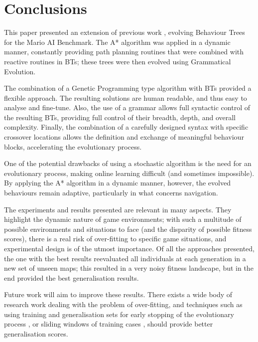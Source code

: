 \documentclass[conference]{IEEEtran}
\begin{document}
\section{Conclusions}

This paper presented an extension of previous work \cite{PNO11}, evolving
Behaviour Trees for the Mario AI Benchmark. The A* algorithm was applied in a
dynamic manner, constantly providing path planning routines that were combined
with reactive routines in BTs; these trees were then evolved using Grammatical
Evolution.

The combination of a Genetic Programming type algorithm with BTs provided a
flexible approach. The resulting solutions are human readable, and
thus easy to analyse and fine-tune. Also, the use of a grammar allows full
syntactic control of the resulting BTs, providing full control of their
breadth, depth, and overall complexity. Finally, the
combination of a carefully designed syntax with specific crossover locations
allows the definition and exchange of meaningful behaviour blocks, accelerating
the evolutionary process.

One of the potential drawbacks of using a stochastic algorithm is the need for
an evolutionary process, making online learning difficult (and sometimes
impossible). By applying the A* algorithm in a dynamic manner, however, the
evolved behaviours remain adaptive, particularly in what concerns navigation.

The experiments and results presented are relevant in many aspects. They
highlight the dynamic nature of game environments; with such a multitude of
possible environments and situations to face (and the disparity of possible
fitness scores), there is a real risk of over-fitting to specific game
situations, and experimental design is of the utmost importance. Of all the
approaches presented, the one with the best results reevaluated all individuals
at each generation in a new set of unseen maps; this resulted in a very noisy
fitness landscape, but in the end provided the best generalisation results.

Future work will aim to improve these results. There exists a wide body of research work
dealing with the problem of over-fitting, and techniques such as using training
and generalisation sets for early stopping of the evolutionary process
\cite{Pre97}, or sliding windows of training cases \cite{WAW07}, should provide
better generalisation scores.
\end{document}
